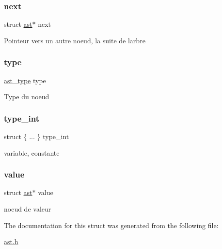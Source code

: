 \subsubsection{\texorpdfstring{next}{next}}
{\footnotesize\ttfamily struct \hyperlink{structast}{ast}$\ast$ next}

Pointeur vers un autre noeud, la suite de l\textquotesingle{}arbre \mbox{\label{structast_a8321fc8e556a418583dd74ee9fcc2bf7}} 
\subsubsection{\texorpdfstring{type}{type}}
{\footnotesize\ttfamily \hyperlink{ast_8h_a77091c187ac9a89404fac2e8226daef3}{ast\+\_\+type} type}

Type du noeud \mbox{\label{structast_a48c1fea64ccd73c68d3901c23d65f9f5}} 
\subsubsection{\texorpdfstring{type\+\_\+int}{type\_int}}
{\footnotesize\ttfamily struct \{ ... \}   type\+\_\+int}

variable, constante \mbox{\label{structast_a0547e48c9f9ecb35c94f988890f217b7}} 
\subsubsection{\texorpdfstring{value}{value}}
{\footnotesize\ttfamily struct \hyperlink{structast}{ast}$\ast$ value}

noeud de valeur 

The documentation for this struct was generated from the following file\+:\begin{DoxyCompactItemize}
\item 
\hyperlink{ast_8h}{ast.\+h}\end{DoxyCompactItemize}
